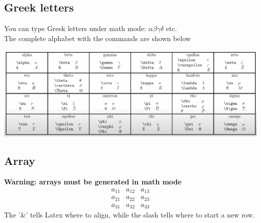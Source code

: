 \documentclass[a4paper, 12pt]{article}
\begin{document}
\subsection{Greek letters}
\noindent You can type Greek letters under math mode: \( \alpha \beta \gamma \delta\) etc. \\

\noindent The complete alphabet with the commands are shown below

\includegraphics[width=\linewidth]{Greek_letters.png}

\subsection{Array}
\noindent \textbf{Warning: arrays must be generated in math mode}
\[
\begin{array}{ccc}
    \label{array: example}
    a_{11} & a_{12} & a_{13}  \\
    a_{21} & a_{22} & a_{23}  \\
    a_{31} & a_{32} & a_{33}
\end{array}
\]
The '\&' tells Latex where to align, while the slash tells where to start a new row.
\end{document}
